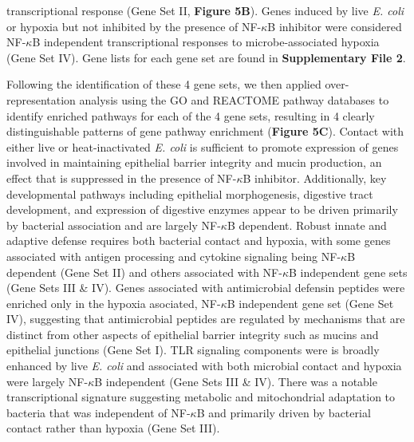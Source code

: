 \documentclass[9pt,lineo]{elife}
\begin{document}
transcriptional response (Gene Set II, \textbf{Figure 5B}). Genes induced by live \emph{E. coli} or hypoxia but not inhibited by the presence of NF-\(\kappa\)B inhibitor were considered NF-\(\kappa\)B independent transcriptional responses to microbe-associated hypoxia (Gene Set IV). Gene lists for each gene set are found in \textbf{Supplementary File 2}.

Following the identification of these 4 gene sets, we then applied over-representation analysis using the GO and REACTOME pathway databases to identify enriched pathways for each of the 4 gene sets, resulting in 4 clearly distinguishable patterns of gene pathway enrichment (\textbf{Figure 5C}). Contact with either live or heat-inactivated \emph{E. coli} is sufficient to promote expression of genes involved in maintaining epithelial barrier integrity and mucin production, an effect that is suppressed in the presence of NF-\(\kappa\)B inhibitor. Additionally, key developmental pathways including epithelial morphogenesis, digestive tract development, and expression of digestive enzymes appear to be driven primarily by bacterial association and are largely NF-\(\kappa\)B dependent. Robust innate and adaptive defense requires both bacterial contact and hypoxia, with some genes associated with antigen processing and cytokine signaling being NF-\(\kappa\)B dependent (Gene Set II) and others associated with NF-\(\kappa\)B independent gene sets (Gene Sets III \& IV). Genes associated with antimicrobial defensin peptides were enriched only in the hypoxia asociated, NF-\(\kappa\)B independent gene set (Gene Set IV), suggesting that antimicrobial peptides are regulated by mechanisms that are distinct from other aspects of epithelial barrier integrity such as mucins and epithelial junctions (Gene Set I). TLR signaling components were is broadly enhanced by live \emph{E. coli} and associated with both microbial contact and hypoxia were largely NF-\(\kappa\)B independent (Gene Sets III \& IV). There was a notable transcriptional signature suggesting metabolic and mitochondrial adaptation to bacteria that was independent of NF-\(\kappa\)B and primarily driven by bacterial contact rather than hypoxia (Gene Set III).
\end{document}

